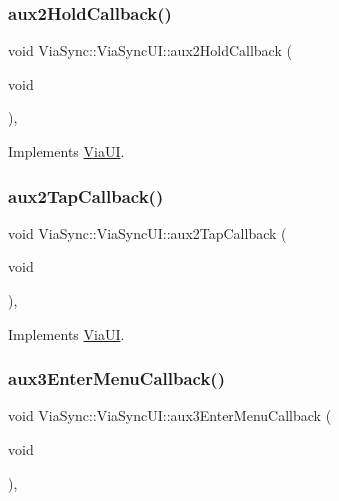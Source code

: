 \subsubsection{\texorpdfstring{aux2\+Hold\+Callback()}{aux2HoldCallback()}}
{\footnotesize\ttfamily void Via\+Sync\+::\+Via\+Sync\+U\+I\+::aux2\+Hold\+Callback (\begin{DoxyParamCaption}\item[{void}]{ }\end{DoxyParamCaption})\hspace{0.3cm}{\ttfamily [override]}, {\ttfamily [virtual]}}



Implements \mbox{\hyperlink{class_via_u_i_a42545b69c2bbbb036f633140fd8007d6}{Via\+UI}}.

\mbox{\label{class_via_sync_1_1_via_sync_u_i_a117e57feaf74b2619c1506aacc421721}} 
\subsubsection{\texorpdfstring{aux2\+Tap\+Callback()}{aux2TapCallback()}}
{\footnotesize\ttfamily void Via\+Sync\+::\+Via\+Sync\+U\+I\+::aux2\+Tap\+Callback (\begin{DoxyParamCaption}\item[{void}]{ }\end{DoxyParamCaption})\hspace{0.3cm}{\ttfamily [override]}, {\ttfamily [virtual]}}



Implements \mbox{\hyperlink{class_via_u_i_ae5e009dc22002f62e6bff8dd76d2f745}{Via\+UI}}.

\mbox{\label{class_via_sync_1_1_via_sync_u_i_a66f7a9ccbfff3b1b1ba32fe775808703}} 
\subsubsection{\texorpdfstring{aux3\+Enter\+Menu\+Callback()}{aux3EnterMenuCallback()}}
{\footnotesize\ttfamily void Via\+Sync\+::\+Via\+Sync\+U\+I\+::aux3\+Enter\+Menu\+Callback (\begin{DoxyParamCaption}\item[{void}]{ }\end{DoxyParamCaption})\hspace{0.3cm}{\ttfamily [override]}, {\ttfamily [virtual]}}



